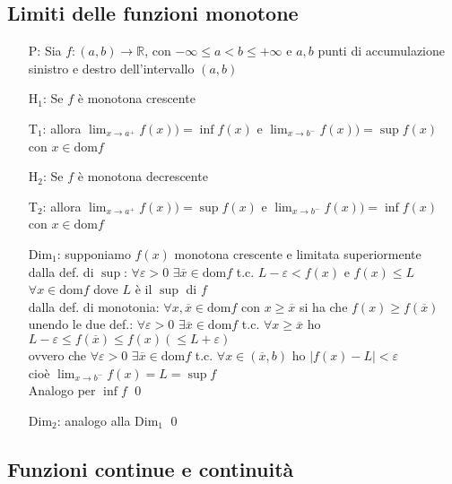 \documentclass[a4paper]{article}
\newcommand\dom{\text{dom}}
\begin{document}
\subsection{Limiti delle funzioni monotone}
\begin{itemize}
	\item[P:] Sia \(f: \left(a,b\right) \to \mathbb{R}\), con \(-\infty \leq a < b \leq + \infty\) e 
	\(a, b\) punti di accumulazione sinistro e destro dell'intervallo \(\left(a,b\right)\)
	\item[H\(_1\):] Se \(f\) è monotona crescente
	\item[T\(_1\):] allora \(\displaystyle \lim_{x \to a^+} f(x)) = \inf f(x)\) e \(\displaystyle \lim_{x \to b^-} f(x)) = \sup f(x)\) con \(x \in \dom f\)
	\item[H\(_2\):] Se \(f\) è monotona decrescente
	\item[T\(_2\):] allora \(\displaystyle \lim_{x \to a^+} f(x)) = \sup f(x)\) e \(\displaystyle \lim_{x \to b^-} f(x)) = \inf f(x)\) con \(x \in \dom f\)
	\item[Dim\(_1\):] supponiamo \(f(x)\) monotona crescente e limitata superiormente \\
	dalla def. di \(\sup\): \(\forall \varepsilon > 0\) \(\exists \overline{x} \in \dom f\) t.c. \(L - \varepsilon < f(x)\) e \(f(x) \leq L\) \(\forall x \in \dom f\) dove \(L\) è il \(\sup\) di \(f\) \\
	dalla def. di monotonia: \(\forall x, \overline{x} \in \dom f\) con \(x \geq \overline{x}\) si ha che \(f(x) \geq f(\overline{x})\) \\
	unendo le due def.: \(\forall \varepsilon > 0\) \(\exists \overline{x} \in \dom f\) t.c. \(\forall x \geq \overline{x}\) ho \(L - \varepsilon \leq f(\overline{x}) \leq f(x) (\leq L + \varepsilon)\) \\
	ovvero che \(\forall \varepsilon > 0\) \(\exists \overline{x} \in \dom f\) t.c. \(\forall x \in \left( \overline{x}, b \right)\) ho \(\left| f(x) - L \right| < \varepsilon\) \\
	cioè \(\displaystyle \lim_{x \to b^-} f(x) = L = \sup f\) \\
	Analogo per \(\inf f\) \qed
	\item[Dim\(_2\):] analogo alla Dim\(_1\) \qed
\end{itemize}

\newpage

\subsection{Funzioni continue e continuità}
\end{document}
